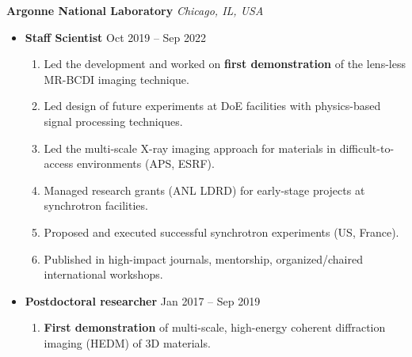 {\color{black}\textbf{Argonne National Laboratory} \hfill \textit{Chicago, IL, USA}}\par
\begin{itemize}
    \item
        \textbf{Staff Scientist}
        \hfill  {Oct 2019 -- Sep 2022} \par
        \begin{enumerate}
            \item Led the development and worked on \textbf{first demonstration} of the lens-less MR-BCDI imaging technique.
            \item Led design of future experiments at DoE facilities with physics-based signal processing techniques.
            \item Led the multi-scale X-ray imaging approach for materials in difficult-to-access environments (APS, ESRF).
            \item Managed research grants (ANL LDRD) for early-stage projects at synchrotron facilities.
            \item Proposed and executed successful synchrotron experiments (US, France).
            \item Published in high-impact journals, mentorship, organized/chaired international workshops.
        \end{enumerate}
    \item
        \textbf{Postdoctoral researcher}
        \hfill  {Jan 2017 -- Sep 2019} \par
        \begin{enumerate}
            \item \textbf{First demonstration} of multi-scale, high-energy coherent diffraction imaging (HEDM) of 3D materials.
        \end{enumerate}
\end{itemize}